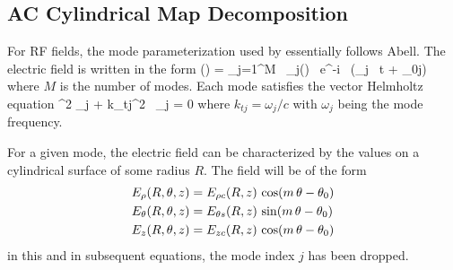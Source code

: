 \subsection{AC Cylindrical Map Decomposition}
\label{s:cylind.ac}

For RF fields, the  mode parameterization used by \bmad essentially
follows Abell\cite{b:rf.abell}. The electric field is written in the form
\Begineq
  \bfE(\bfr) = \sum_{j=1}^M \, \bfE_j(\bfr) \, e^{-i \, (\omega_j \, t + \theta_{0j})}
  \label{eseei}
\Endeq
where $M$ is the number of modes. Each mode satisfies the vector Helmholtz
equation
\Begineq
  \nabla^2 \bfE_j + k_{tj}^2 \, \bfE_j = 0
  \label{bke}
\Endeq
where $k_{tj} = \omega_j/c$ with $\omega_j$ being the mode frequency.

For a given mode, the electric field can be characterized by the values on 
a cylindrical surface of some radius $R$. The field will be of the form
\begin{align}
  E_\rho(R, \theta, z) &= E_{\rho c}(R, z) \, \cos(m \, \theta - \theta_0) \nonumber \\
  E_\theta(R, \theta, z) &= E_{\theta s}(R, z) \, \sin(m \, \theta - \theta_0) \\
  \label{erpze}
  E_z(R, \theta, z)    &= E_{z c}(R, z)    \, \cos(m \, \theta - \theta_0) \nonumber
\end{align}
in this and in subsequent equations, the mode index $j$ has been
dropped.

